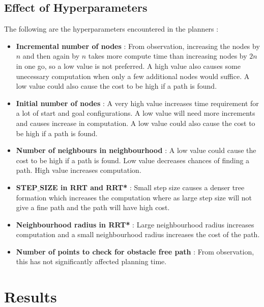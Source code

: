 \documentclass[11pt]{article}
\begin{document}
\subsection{Effect of Hyperparameters}
The following are the hyperparameters encountered in the planners :
\begin{itemize}
    \item \textbf{Incremental number of nodes} : From observation, increasing the nodes by $n$ and then again by $n$ takes more compute time than increasing nodes by $2n$ in one go, so a low value is not preferred. A high value also causes some unecessary computation when only a few additional nodes would suffice. A low value could also cause the cost to be high if a path is found.
    \item \textbf{Initial number of nodes} : A very high value increases time requirement for a lot of start and goal configurations. A low value will need more increments and causes increase in computation. A low value could also cause the cost to be high if a path is found.
    \item \textbf{Number of neighbours in neighbourhood} :  A low value could cause the cost to be high if a path is found. Low value decreases chances of finding a path. High value increases computation.
    \item\textbf{ STEP$\_$SIZE in RRT and RRT*} : Small step size causes a denser tree formation which increases the computation where as large step size will not give a fine path and the path will have high cost. 
    \item \textbf{Neighbourhood radius in RRT*} : Large neighbourhood radius increases computation and a small neighbourhood radius increases the cost of the path.
    \item \textbf{Number of points to check for obstacle free path} : From observation, this has not significantly affected planning time.
\end{itemize} 

\section{Results}
\end{document}
